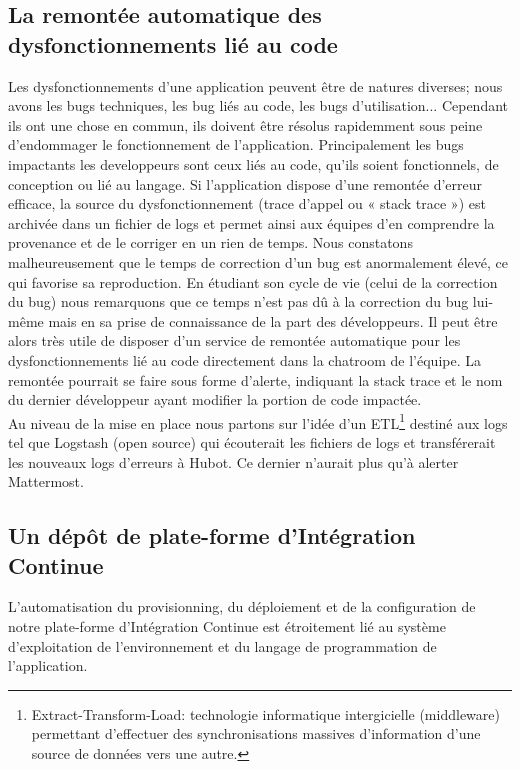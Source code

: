       \subsection{La remontée automatique des dysfonctionnements lié au code}
      Les dysfonctionnements d'une application peuvent être de natures diverses; nous avons les bugs techniques, les bug liés au code, les bugs d'utilisation... Cependant ils ont une chose en commun, ils doivent être résolus rapidemment sous peine d'endommager le fonctionnement de l'application. Principalement les bugs impactants les developpeurs sont ceux liés au code, qu'ils soient fonctionnels, de conception ou lié au langage. Si l'application dispose d'une remontée d'erreur efficace, la source du dysfonctionnement (trace d'appel ou « stack trace ») est archivée dans un fichier de logs et permet ainsi aux équipes d'en comprendre la provenance et de le corriger en un rien de temps. Nous constatons malheureusement que le temps de correction d'un bug est anormalement élevé, ce qui favorise sa reproduction. En étudiant son cycle de vie (celui de la correction du bug) nous remarquons que ce temps n'est pas dû à la correction du bug lui-même mais en sa prise de connaissance de la part des développeurs. Il peut être alors très utile de disposer d'un service de remontée automatique pour les dysfonctionnements lié au code directement dans la chatroom de l'équipe. La remontée pourrait se faire sous forme d'alerte, indiquant la stack trace et le nom du dernier développeur ayant modifier la portion de code impactée.\\

      Au niveau de la mise en place nous partons sur l'idée d'un ETL\footnote{Extract-Transform-Load: technologie informatique intergicielle (middleware) permettant d'effectuer des synchronisations massives d'information d'une source de données vers une autre.} destiné aux logs tel que Logstash (open source) qui écouterait les fichiers de logs et transférerait les nouveaux logs d'erreurs à Hubot. Ce dernier n'aurait plus qu'à alerter Mattermost.

      \subsection{Un dépôt de plate-forme d'Intégration Continue}
      L'automatisation du provisionning, du déploiement et de la configuration de notre plate-forme d'Intégration Continue est étroitement lié au système d'exploitation de l'environnement et du langage de programmation de l'application.
